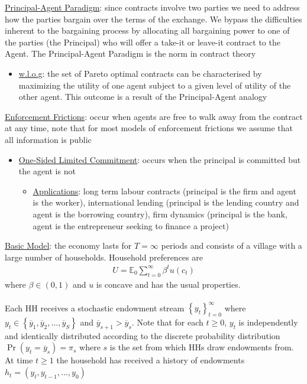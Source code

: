 \documentclass{article}
\begin{document}
\vspace{2.5mm}
\par \underline{Principal-Agent Paradigm}: since contracts involve two parties we need to address how the parties bargain over  the terms of the exchange. We bypass the difficulties inherent to the bargaining process by allocating all bargaining power to one of the parties (the Principal) who will offer a take-it or leave-it contract to the Agent. The Principal-Agent Paradigm is the norm in contract theory
\begin{itemize}
    \item \underline{w.l.o.g}: the set of Pareto optimal contracts can be characterised by maximizing the utility of one agent subject to a given level of utility of the other agent. This outcome is a result of the Principal-Agent analogy
\end{itemize}
\vspace{2.5mm}
\par \underline{Enforcement Frictions}: occur when agents are free to walk away from the contract at any time, note that for most models of enforcement frictions we assume that all information is public
\begin{itemize}
    \item  \underline{One-Sided Limited Commitment}: occurs when the principal is committed but the agent is not
    \begin{itemize}
        \item \underline{Applications}: long term labour contracts (principal is the firm and agent is the worker), international lending (principal is the lending country and agent is the borrowing country), firm dynamics (principal is the bank, agent is the entrepreneur seeking to finance a project)
    \end{itemize}
\end{itemize}
\vspace{2.5mm}
\par \underline{Basic Model}: the economy lasts for $T = \infty$ periods and consists of a village with a large number of households. Household preferences are
\begin{gather*}
    U = \mathbb{E}_{0} \sum_{t = 0}^{\infty} \beta^{t} u(c_{t})
\end{gather*}
where $\beta \in (0, 1)$ and $u$ is concave and has the usual properties. \\ \\ Each HH receives a stochastic endowment stream $\left\{y_{t}\right\}_{t=0}^{\infty}$ where $y_{t} \in \left\{ \overline{y}_{1}, \overline{y}_{2}, \dots, \overline{y}_{S} \right\}$ and $\overline{y}_{s+1} > \overline{y}_{s}$. Note that for each $t \geq 0$, $y_{t}$ is independently and identically distributed according to the discrete probability distribution $\Pr(y_{t} = \overline{y}_{s}) = \pi_{s}$ where $s$ is the set from which HHs draw endowments from. At time $t\geq 1$ the household has received a history of endowments $h_{t} = (y_{t}, y_{t-1}, \dots, y_{0})$
\end{document}
